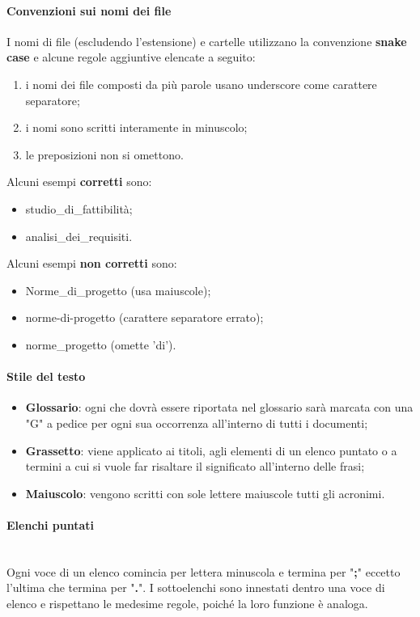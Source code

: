 		\paragraph{Convenzioni sui nomi dei file}
		I nomi di file (escludendo l'estensione) e cartelle utilizzano la convenzione \textbf{snake case} e alcune regole aggiuntive elencate a seguito:
		\begin{enumerate}
			\item i nomi dei file composti da più parole usano underscore come carattere separatore;
			\item i nomi sono scritti interamente in minuscolo;
			\item le preposizioni non si omettono.
		\end{enumerate}
		Alcuni esempi \textbf{corretti} sono:
		\begin{itemize}
			\item studio\_di\_fattibilità;
			\item analisi\_dei\_requisiti.
		\end{itemize}	 	
		Alcuni esempi \textbf{non corretti} sono: 
		\begin{itemize}
			\item Norme\_di\_progetto (usa maiuscole);
			\item norme-di-progetto (carattere separatore errato);
			\item norme\_progetto (omette 'di').
		\end{itemize}			
		\paragraph{Stile del testo}
		\begin{itemize}
			\item \textbf{Glossario}: ogni che dovrà essere riportata nel glossario sarà marcata con una "G" a pedice per ogni sua occorrenza all'interno di tutti i documenti;
			\item \textbf{Grassetto}: viene applicato ai titoli, agli elementi di un elenco puntato o a termini a cui si vuole far risaltare il significato all'interno delle frasi;
			\item \textbf{Maiuscolo}: vengono scritti con sole lettere maiuscole tutti gli acronimi.
		\end{itemize}
		\paragraph{Elenchi puntati} \mbox{}\\
		Ogni voce di un elenco comincia per lettera minuscola e termina per "\textbf{;}" eccetto l'ultima che termina per "\textbf{.}". I sottoelenchi sono innestati dentro una voce di elenco e rispettano le medesime regole, poiché la loro funzione è analoga.
